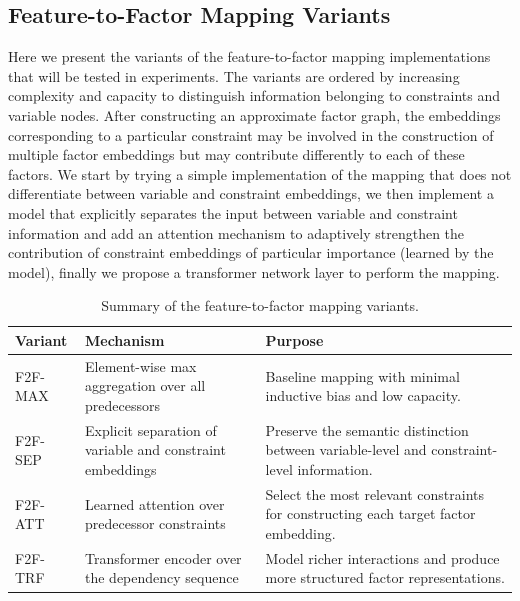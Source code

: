 

\subsection{Feature-to-Factor Mapping Variants}
Here we present the variants of the feature-to-factor mapping implementations that will be tested in experiments. The variants are ordered by increasing complexity and capacity to distinguish information belonging to constraints and variable nodes. After constructing an approximate factor graph, the embeddings corresponding to a particular constraint may be involved in the construction of multiple factor embeddings but may contribute differently to each of these factors. We start by trying a simple implementation of the mapping that does not differentiate between variable and constraint embeddings, we then implement a model that explicitly separates the input between variable and constraint information and add an attention mechanism to adaptively strengthen the contribution of constraint embeddings of particular importance (learned by the model), finally we propose a transformer network layer to perform the mapping. 

\begin{table}[H]
\centering
\small
\begin{tabular}{p{2.3cm} p{3.2cm} p{7.8cm}}
\toprule
\textbf{Variant} & \textbf{Mechanism} & \textbf{Purpose} \\
\midrule
F2F-MAX & Element-wise max aggregation over all predecessors & Baseline mapping with minimal inductive bias and low capacity. \\
F2F-SEP & Explicit separation of variable and constraint embeddings & Preserve the semantic distinction between variable-level and constraint-level information. \\
F2F-ATT & Learned attention over predecessor constraints & Select the most relevant constraints for constructing each target factor embedding. \\
F2F-TRF & Transformer encoder over the dependency sequence & Model richer interactions and produce more structured factor representations. \\
\bottomrule
\end{tabular}
\caption{Summary of the feature-to-factor mapping variants.}
\label{tab:f2f_mapping_variants_compact}
\end{table}


